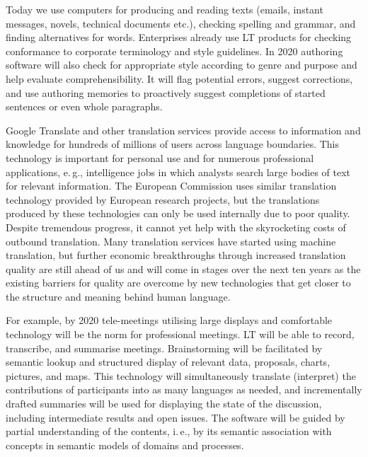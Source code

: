 \documentclass[10pt, plain]{../../metanetpaper}
\begin{document}
\begin{multicols}{2}
Today we use computers for producing and reading texts (emails, instant messages, novels, technical documents etc.), checking spelling and grammar, and finding alternatives for words. Enterprises already use LT products for checking conformance to corporate terminology and style guidelines. In 2020 authoring software will also check for appropriate style according to genre and purpose and help evaluate comprehensibility. It will flag potential errors, suggest corrections, and use authoring memories to proactively suggest completions of started sentences or even whole paragraphs.
 
Google Translate and other translation services provide access to information and knowledge for hundreds of millions of users across language boundaries. This technology is important for personal use and for numerous professional applications, e.\,g., intelligence jobs in which analysts search large bodies of text for relevant information. The European Commission uses similar translation technology provided by European research projects, but the translations produced by these technologies can only be used internally due to poor quality. Despite tremendous progress, it cannot yet help with the skyrocketing costs of outbound translation. Many translation services have started using machine translation, but further economic breakthroughs through increased translation quality are still ahead of us and will come in stages over the next ten years as the existing barriers for quality are overcome by new technologies that get closer to the structure and meaning behind human language.
 
For example, by 2020 tele-meetings utilising large displays and comfortable technology will be the norm for professional meetings. LT will be able to record, transcribe, and summarise meetings. Brainstorming will be facilitated by semantic lookup and structured display of relevant data, proposals, charts, pictures, and maps. This technology will simultaneously translate (interpret) the contributions of participants into as many languages as needed, and incrementally drafted summaries will be used for displaying the state of the discussion, including intermediate results and open issues. The software will be guided by partial understanding of the contents, i.\,e., by its semantic association with concepts in semantic models of domains and processes. 


\end{multicols}
\end{document}
